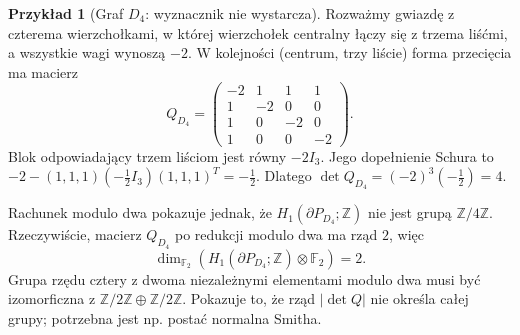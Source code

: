 \documentclass[11pt,a4paper]{report}
\numberwithin{equation}{section}
\theoremstyle{plain}
\theoremstyle{definition}
\newtheorem{przyklad}[twierdzenie]{Przykład}
\theoremstyle{remark}
\begin{document}
\begin{przyklad}[Graf $D_4$: wyznacznik nie wystarcza]
Rozważmy gwiazdę z czterema wierzchołkami, w której
wierzchołek centralny łączy się z trzema liśćmi,
a wszystkie wagi wynoszą $-2$. W kolejności
(centrum, trzy liście) forma przecięcia ma macierz
\[
Q_{D_4}=\begin{pmatrix}
-2&1&1&1\\1&-2&0&0\\1&0&-2&0\\1&0&0&-2
\end{pmatrix}.
\]
Blok odpowiadający trzem liściom jest równy $-2I_3$.
Jego dopełnienie Schura to
$-2-(1,1,1)(-\tfrac12I_3)(1,1,1)^T=-\tfrac12$.
Dlatego $\det Q_{D_4}=(-2)^3(-\tfrac12)=4$.

Rachunek modulo dwa pokazuje jednak, że
$H_1(\partial P_{D_4};\mathbb Z)$ nie jest grupą
$\mathbb Z/4\mathbb Z$. Rzeczywiście, macierz
$Q_{D_4}$ po redukcji modulo dwa ma rząd $2$, więc
\[
\dim_{\mathbb F_2}
(H_1(\partial P_{D_4};\mathbb Z)\otimes\mathbb F_2)=2.
\]
Grupa rzędu cztery z dwoma niezależnymi elementami
modulo dwa musi być izomorficzna z
$\mathbb Z/2\mathbb Z\oplus\mathbb Z/2\mathbb Z$.
Pokazuje to, że rząd $|\det Q|$ nie określa całej
grupy; potrzebna jest np. postać normalna Smitha.
\end{przyklad}

\begin{center}
\end{center}
\end{document}
